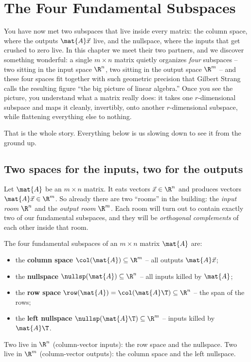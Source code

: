 \chapter{The Four Fundamental Subspaces}

You have now met two subspaces that live inside every matrix: the column space, where the
outputs $\mat{A}\vec{x}$ live, and the nullspace, where the inputs that get crushed to zero
live. In this chapter we meet their two partners, and we discover something wonderful: a single
$m \times n$ matrix quietly organizes \emph{four} subspaces -- two sitting in the input space
$\R^n$, two sitting in the output space $\R^m$ -- and these four spaces fit together with such
geometric precision that Gilbert Strang calls the resulting figure ``the big picture of linear
algebra.'' Once you see the picture, you understand what a matrix really does: it takes one
$r$-dimensional subspace and maps it cleanly, invertibly, onto another $r$-dimensional subspace,
while flattening everything else to nothing.

That is the whole story. Everything below is us slowing down to see it from the ground up.

\section{Two spaces for the inputs, two for the outputs}

Let $\mat{A}$ be an $m \times n$ matrix. It eats vectors $\vec{x} \in \R^n$ and produces
vectors $\mat{A}\vec{x} \in \R^m$. So already there are two ``rooms'' in the building: the
\emph{input room} $\R^n$ and the \emph{output room} $\R^m$. Each room will turn out to contain
exactly two of our fundamental subspaces, and they will be \emph{orthogonal complements} of
each other inside that room.

\begin{focusbox}
The four fundamental subspaces of an $m \times n$ matrix $\mat{A}$ are:
\begin{itemize}
  \item the \textbf{column space} $\col(\mat{A}) \subseteq \R^m$ -- all outputs $\mat{A}\vec{x}$;
  \item the \textbf{nullspace} $\nullsp(\mat{A}) \subseteq \R^n$ -- all inputs killed by $\mat{A}$;
  \item the \textbf{row space} $\row(\mat{A}) = \col(\mat{A}\T) \subseteq \R^n$ -- the span of the rows;
  \item the \textbf{left nullspace} $\nullsp(\mat{A}\T) \subseteq \R^m$ -- inputs killed by $\mat{A}\T$.
\end{itemize}
Two live in $\R^n$ (column-vector inputs): the row space and the nullspace.
Two live in $\R^m$ (column-vector outputs): the column space and the left nullspace.
\end{focusbox}

